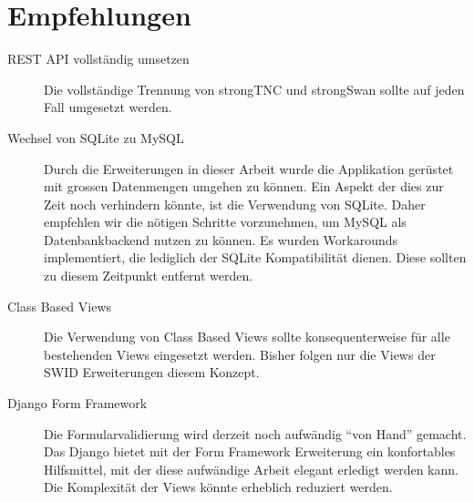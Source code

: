 \section{Empfehlungen} \begin{description} \item[REST API vollständig umsetzen]
Die vollständige Trennung von strongTNC und strongSwan sollte auf jeden Fall
umgesetzt werden. \item[Wechsel von SQLite zu MySQL] Durch die Erweiterungen in
dieser Arbeit wurde die Applikation gerüstet mit grossen Datenmengen umgehen zu
können. Ein Aspekt der dies zur Zeit noch verhindern könnte, ist die Verwendung
von SQLite. Daher empfehlen wir die nötigen Schritte vorzunehmen, um MySQL als
Datenbankbackend nutzen zu können. Es wurden Workarounds implementiert, die
lediglich der SQLite Kompatibilität dienen. Diese sollten zu diesem Zeitpunkt
entfernt werden. \item[Class Based Views] Die Verwendung von Class Based Views
sollte konsequenterweise für alle bestehenden Views eingesetzt werden. Bisher
folgen nur die Views der SWID Erweiterungen diesem Konzept. \item[Django Form
Framework] Die Formularvalidierung wird derzeit noch aufwändig \enquote{von
Hand} gemacht. Das Django bietet mit der Form Framework Erweiterung ein
konfortables Hilfsmittel, mit der diese aufwändige Arbeit elegant erledigt
werden kann. Die Komplexität der Views könnte erheblich reduziert werden.
\item[] \end{description}